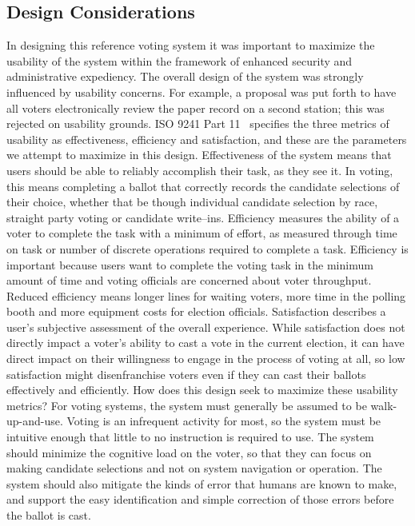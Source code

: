 \subsection{Design Considerations}
In designing this reference voting system it was important to maximize the usability of the system within the framework of enhanced security and administrative expediency. The overall design of the system was strongly influenced by usability concerns. For example, a proposal was put forth to have all voters electronically review the paper record on a second station; this was rejected on usability grounds.
ISO 9241 Part 11~\cite{iso1998} specifies the three metrics of usability as effectiveness, efficiency and satisfaction, and these are the parameters we attempt to maximize in this design. Effectiveness of the system means that users should be able to reliably accomplish their task, as they see it. In voting, this means completing a ballot that correctly records the candidate selections of their choice, whether that be though individual candidate selection by race, straight party voting or candidate write–ins. Efficiency measures the ability of a voter to complete the task with a minimum of effort, as measured through time on task or number of discrete operations required to complete a task. Efficiency is important because users want to complete the voting task in the minimum amount of time and voting officials are concerned about voter throughput. Reduced efficiency means longer lines for waiting voters, more time in the polling booth and more equipment costs for election officials. Satisfaction describes a user's subjective assessment of the overall experience. While satisfaction does not directly impact a voter's ability to cast a vote in the current election, it can have direct impact on their willingness to engage in the process of voting at all, so low satisfaction might disenfranchise voters even if they can cast their ballots effectively and efficiently. 
How does this design seek to maximize these usability metrics? For voting systems, the system must generally be assumed to be walk-up-and-use. Voting is an infrequent activity for most, so the system must be intuitive enough that little to no instruction is required to use. The system should minimize the cognitive load on the voter, so that they can focus on making candidate selections and not on system navigation or operation. The system should also mitigate the kinds of error that humans are known to make, and support the easy identification and simple correction of those errors before the ballot is cast. 

